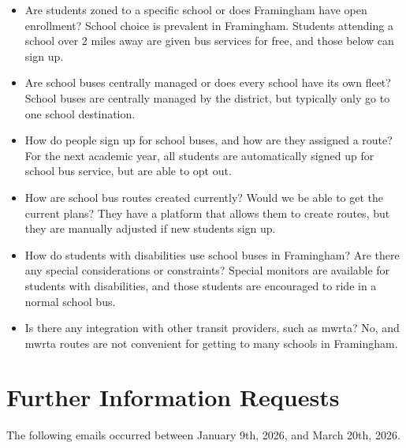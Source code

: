 \begin{itemize}
    \item Are students zoned to a specific school or does Framingham have open enrollment? School choice is prevalent in Framingham. Students attending a school over 2 miles away are given bus services for free, and those below can sign up. 
    \item Are school buses centrally managed or does every school have its own fleet? School buses are centrally managed by the district, but typically only go to one school destination.
    \item How do people sign up for school buses, and how are they assigned a route? For the next academic year, all students are automatically signed up for school bus service, but are able to opt out.
    \item How are school bus routes created currently? Would we be able to get the current plans? They have a platform that allows them to create routes, but they are manually adjusted if new students sign up.
    \item How do students with disabilities use school buses in Framingham? Are there any special considerations or constraints? Special monitors are available for students with disabilities, and those students are encouraged to ride in a normal school bus.
    \item Is there any integration with other transit providers, such as \gls{mwrta}? No, and \gls{mwrta} routes are not convenient for getting to many schools in Framingham.
\end{itemize}

\section{Further Information Requests}

The following emails occurred between January 9th, 2026, and March 20th, 2026.

